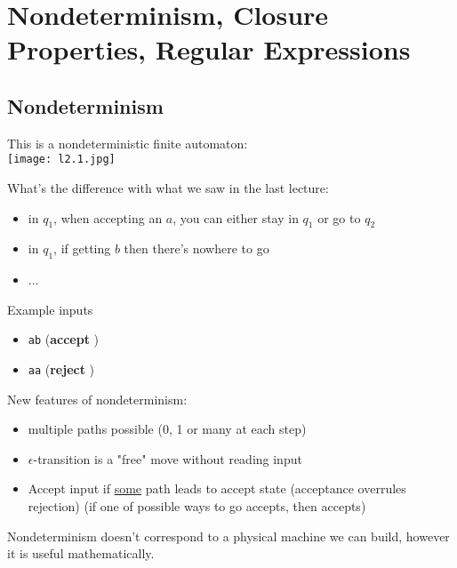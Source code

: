 \chapter{Nondeterminism, Closure Properties, Regular Expressions}

\section{Nondeterminism}

\begin{eg}\label{eg: NFA}
    This is a nondeterministic finite automaton:\\
    \texttt{[image: l2.1.jpg]}
    
    What's the difference with what we saw in the last lecture:
    \begin{itemize}
        \item in \(q_1\), when accepting an \(a\), you can either stay in \(q_1\) or go to \(q_2\)
        \item in \(q_1\), if getting \(b\) then there's nowhere to go 
        \item ...
    \end{itemize}

    Example inputs
    \begin{itemize}
        \item \verb|ab| (\textbf{accept} )
        \item \verb|aa| (\textbf{reject} )
    \end{itemize}

\end{eg}

New features of nondeterminism:
\begin{itemize}
    \item multiple paths possible (0, 1 or many at each step)
    \item \(\epsilon\)-transition is a "free" move without reading input
    \item Accept input if \underline{some} path leads to accept state (acceptance overrules rejection) (if one of possible ways to go accepts, then accepts)
\end{itemize}

Nondeterminism doesn't correspond to a physical machine we can build, however it is useful mathematically.

